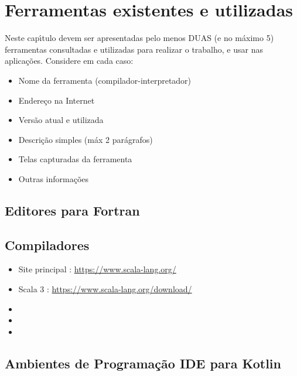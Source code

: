 


\chapter{Ferramentas existentes e utilizadas}

Neste cap\'{\i}tulo devem ser apresentadas pelo menos DUAS (e no m\'{a}ximo 5) ferramentas consultadas e utilizadas para realizar o trabalho, e usar nas aplica\c{c}\~{o}es. Considere em cada caso:
\begin{itemize}
  \item Nome da ferramenta (compilador-interpretador)
  \item Endere\c{c}o na Internet
  \item Vers\~{a}o atual e utilizada
  \item Descri\c{c}\~{a}o simples (m\'{a}x 2 par\'{a}grafos)
  \item Telas capturadas da ferramenta
  \item Outras informa\c{c}\~{o}es
\end{itemize}


    \section{Editores para Fortran}


    \section{Compiladores}
            \begin{itemize}
              \item Site principal : \url{https://www.scala-lang.org/}
              \item Scala 3 : \url{https://www.scala-lang.org/download/}
              \item
              \item
              \item
            \end{itemize}



    \section{Ambientes de Programa\c{c}\~{a}o IDE para Kotlin}
